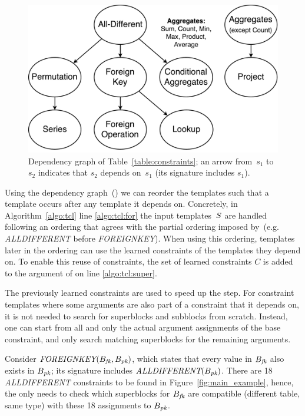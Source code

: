 \begin{figure}[t]
  \centering
  \includegraphics[width=0.65\linewidth]{figures/constraint_dependency2.pdf}
  \caption{Dependency graph of Table~\ref{table:constraints}; an arrow from~$s_1$ to~$s_2$ indicates that $s_2$ depends on~$s_1$ (its signature includes $s_1$).
  }
  \label{fig:learning_order}
\end{figure}

Using the dependency graph~(\dependencies) we can reorder the templates such that a template occurs after any template it depends on.
Concretely, in Algorithm~\ref{algo:tcl} line \ref{algo:tcl:for} the input templates~$S$ are handled following an ordering that agrees with the partial ordering imposed by~\dependencies (e.g. \textit{ALLDIFFERENT} before \textit{FOREIGNKEY}).
When using this ordering, templates later in the ordering can use the learned constraints of the templates they depend on.
To enable this reuse of constraints, the set of learned constraints $C$ is added to the argument of \generategroups on line \ref{algo:tcl:super}.

The previously learned constraints are used to speed up the \generategroups step. For constraint templates where some arguments are also part of a constraint that it depends on, it is not needed to search for superblocks and subblocks from scratch. Instead, one can start from all and only the actual argument assignments of the base constraint, and only search matching superblocks for the remaining arguments.

\begin{example}
  Consider $\textit{FOREIGNKEY}(B_{\textit{fk}},B_{\textit{pk}})$, which states that every value in $B_{\textit{fk}}$ also exists in $B_{\textit{pk}}$; its signature includes $\textit{ALLDIFFERENT}(B_{\textit{pk}})$. There are 18 \textit{ALLDIFFERENT} constraints to be found in Figure~\ref{fig:main_example}, hence, the \generategroups only needs to check which superblocks for $B_{\textit{fk}}$ are compatible (different table, same type) with these 18 assignments to $B_{\textit{pk}}$.
\end{example}

